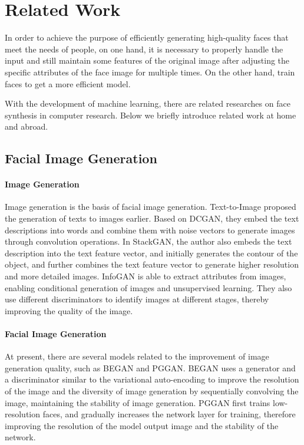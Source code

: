 \section{Related Work}

In order to achieve the purpose of efficiently generating high-quality faces that meet the needs of people, on one hand,
    it is necessary to properly handle the input and still maintain some features of the original image after adjusting the specific attributes of the face image for multiple times.
On the other hand, train faces to get a more efficient model.

With the development of machine learning, there are related researches on face synthesis in computer research.
Below we briefly introduce related work at home and abroad.

\subsection{Facial Image Generation}

\paragraph{Image Generation}

Image generation is the basis of facial image generation.
Text-to-Image proposed the generation of texts to images earlier.
Based on DCGAN, they embed the text descriptions into words and combine them with noise vectors to generate images through convolution operations.
In StackGAN, the author also embeds the text description into the text feature vector,
    and initially generates the contour of the object,
    and further combines the text feature vector to generate higher resolution and more detailed images.
    InfoGAN is able to extract attributes from images, enabling conditional generation of images and unsupervised learning.
They also use different discriminators to identify images at different stages, thereby improving the quality of the image.


\paragraph{Facial Image Generation}

At present, there are several models related to the improvement of image generation quality,
    such as BEGAN and PGGAN.
BEGAN uses a generator and a discriminator similar to the variational auto-encoding to improve the resolution of the image and the diversity of image generation by sequentially convolving the image,
    maintaining the stability of image generation.
PGGAN first trains low-resolution faces,
    and gradually increases the network layer for training,
    therefore improving the resolution of the model output image and the stability of the network.



